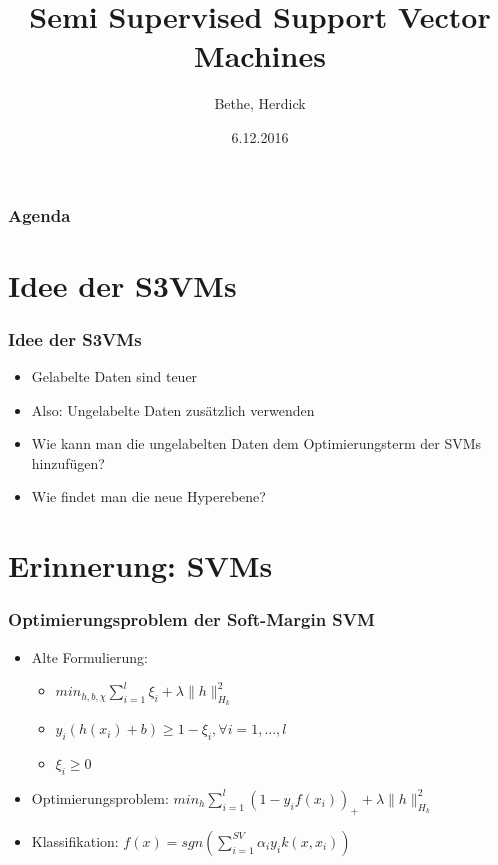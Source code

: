 \documentclass{beamer}
\title{Semi Supervised Support Vector Machines}
\author{Bethe, Herdick}
\date{6.12.2016}
\institute{Classification Algorithms FIN OvGU}
\begin{document}

\newcommand {\framedgraphic}[2] {
    \begin{frame}{#1}
        \begin{center}
            \texttt{[image: \#2]}
        \end{center}
    \end{frame}
}

\begin{frame}[plain]
\titlepage
\end{frame}


\section[Agenda]{}
\begin{frame}
\frametitle{Agenda}
\tableofcontents
\end{frame}

\section{Idee der S3VMs}
\begin{frame}
\frametitle{Idee der S3VMs}
    \begin{itemize}
        \item Gelabelte Daten sind teuer
        \item Also: Ungelabelte Daten zus\"atzlich verwenden
        \item Wie kann man die ungelabelten Daten dem Optimierungsterm der SVMs hinzuf\"ugen?
        \item Wie findet man die neue Hyperebene?
    \end{itemize}
\end{frame}




\section{Erinnerung: SVMs}

\begin{frame}
\frametitle{Optimierungsproblem der Soft-Margin SVM}
    \begin{itemize}
    	\item Alte Formulierung:
    	\begin{itemize}
    		\item $min_{h,b,\chi} \sum_{i=1}^l \xi_i + \lambda \|h\|^2_{H_k}$
    		\item $y_i(h(x_i) + b) \geq 1 - \xi_i, \forall i=1,...,l$
    		\item $\xi_i \geq 0$
    	\end{itemize}
    	\item Optimierungsproblem: $min_h \sum_{i=1}^l (1-y_i f(x_i))_+ + \lambda \|h\|^2_{H_k}$
    	\item Klassifikation: $f(x) = sgn\left(\sum_{i=1}^{SV} \alpha_i y_i k(x, x_i)\right)$
    \end{itemize} 
\end{frame}
\end{document}
